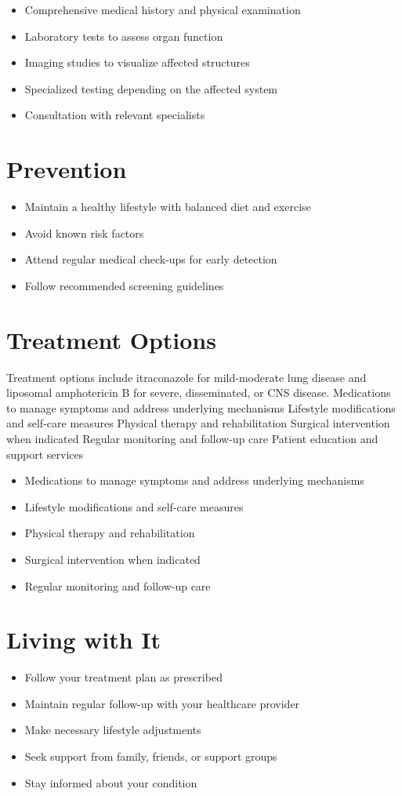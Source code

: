 \begin{itemize}[noitemsep]
  \item Comprehensive medical history and physical examination
  \item Laboratory tests to assess organ function
  \item Imaging studies to visualize affected structures
  \item Specialized testing depending on the affected system
  \item Consultation with relevant specialists
\end{itemize}
\section{Prevention}
\begin{itemize}[noitemsep]
  \item Maintain a healthy lifestyle with balanced diet and exercise
  \item Avoid known risk factors
  \item Attend regular medical check-ups for early detection
  \item Follow recommended screening guidelines
\end{itemize}
\section{Treatment Options}
Treatment options include itraconazole for mild-moderate lung disease and liposomal amphotericin B for severe, disseminated, or CNS disease. Medications to manage symptoms and address underlying mechanisms Lifestyle modifications and self-care measures Physical therapy and rehabilitation Surgical intervention when indicated Regular monitoring and follow-up care Patient education and support services

\begin{itemize}[noitemsep]
  \item Medications to manage symptoms and address underlying mechanisms
  \item Lifestyle modifications and self-care measures
  \item Physical therapy and rehabilitation
  \item Surgical intervention when indicated
  \item Regular monitoring and follow-up care
\end{itemize}
\section{Living with It}
\begin{itemize}[noitemsep]
  \item Follow your treatment plan as prescribed
  \item Maintain regular follow-up with your healthcare provider
  \item Make necessary lifestyle adjustments
  \item Seek support from family, friends, or support groups
  \item Stay informed about your condition
\end{itemize}
